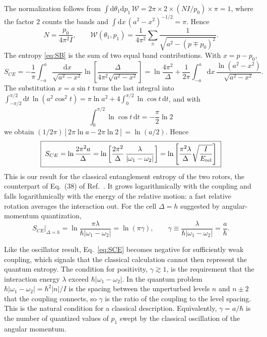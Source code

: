 \documentclass[aps,preprint,12pt,superscriptaddress,nofootinbib]{revtex4-2}
\newcommand{\dd}{\mathrm{d}}
\newcommand{\Erel}{E_{\rm rel}}
\newcommand{\Wc}{\mathcal{W}}
\begin{document}
The normalization follows from
$\int\dd\theta_{1}\dd p_{1}\,\Wc=2\pi\times2\times(NI/p_{0})\times\pi=1$, where the
factor $2$ counts the bands and $\int\dd x\,(a^{2}-x^{2})^{-1/2}=\pi$. Hence
\begin{equation}
N=\frac{p_{0}}{4\pi^{2}I},\qquad
\Wc(\theta_{1},p_{1})=\frac{1}{4\pi^{2}}\sum_{\pm}
\frac{1}{\sqrt{a^{2}-(p\mp p_{0})^{2}}}.
\label{eq:N}
\end{equation}
The entropy \eqref{eq:SB} is the sum of two equal band contributions. With
$x=p-p_{0}$,
\begin{equation}
S_{CE}=-\frac{1}{\pi}\int_{-a}^{a}\frac{\dd x}{\sqrt{a^{2}-x^{2}}}
\ln\left[\frac{\Delta}{4\pi^{2}\sqrt{a^{2}-x^{2}}}\right]
=\ln\frac{4\pi^{2}}{\Delta}+\frac{1}{2\pi}\int_{-a}^{a}\dd x\,
\frac{\ln(a^{2}-x^{2})}{\sqrt{a^{2}-x^{2}}} .
\label{eq:SCE1}
\end{equation}
The substitution $x=a\sin t$ turns the last integral into
$\int_{-\pi/2}^{\pi/2}\dd t\,\ln(a^{2}\cos^{2}t)=\pi\ln a^{2}+4\int_{0}^{\pi/2}
\ln\cos t\,\dd t$, and with~\cite{GR}
\begin{equation}
\int_{0}^{\pi/2}\ln\cos t\,\dd t=-\frac{\pi}{2}\ln2
\label{eq:GR}
\end{equation}
we obtain $(1/2\pi)[2\pi\ln a-2\pi\ln2]=\ln(a/2)$. Hence
\begin{equation}
\boxed{\;S_{CE}=\ln\frac{2\pi^{2}a}{\Delta}
=\ln\left[\frac{2\pi^{2}}{\Delta}\,\frac{\lambda}{|\omega_{1}-\omega_{2}|}\right]
=\ln\left[\frac{\pi^{2}\lambda}{\Delta}\sqrt{\frac{I}{\Erel}}\right]\;}
\label{eq:SCE}
\end{equation}
This is our result for the classical entanglement entropy of the two rotors, the
counterpart of Eq.~(38) of Ref.~\cite{DKS}. It grows logarithmically with the
coupling and falls logarithmically with the energy of the relative motion: a fast
relative rotation averages the interaction out. For the cell $\Delta=h$ suggested
by angular-momentum quantization,
\begin{equation}
S_{CE}\big|_{\Delta=h}=\ln\frac{\pi\lambda}{\hbar|\omega_{1}-\omega_{2}|}
=\ln(\pi\gamma),\qquad
\gamma\equiv\frac{\lambda}{\hbar|\omega_{1}-\omega_{2}|}=\frac{a}{\hbar}.
\label{eq:SCEh}
\end{equation}

Like the oscillator result, Eq.~\eqref{eq:SCE} becomes negative for sufficiently weak
coupling, which signals that the classical calculation cannot then represent the
quantum entropy. The condition for positivity, $\gamma\gtrsim1$, is the requirement
that the interaction energy $\lambda$ exceed $\hbar|\omega_{1}-\omega_{2}|$. In the
quantum problem $\hbar|\omega_{1}-\omega_{2}|=\hbar^{2}|n|/I$ is the spacing between
the unperturbed levels $n$ and $n\pm2$ that the coupling connects, so $\gamma$ is the
ratio of the coupling to the level spacing. This is the natural condition for a
classical description. Equivalently, $\gamma=a/\hbar$ is the number of quantized
values of $p_{1}$ swept by the classical oscillation of the angular momentum.
\end{document}
